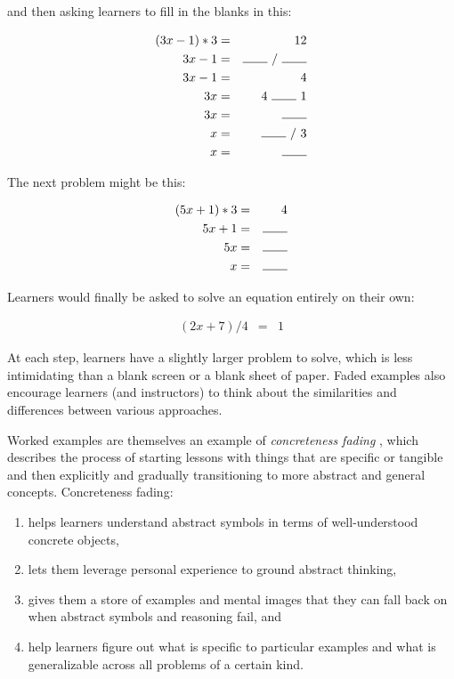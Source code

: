 \documentclass[10pt,letterpaper]{article}
\begin{document}
and then asking learners to fill in the blanks in this:

\begin{eqnarray*}
(3x - 1) * 3 & = & 12 \\
3x - 1 & = & \rule{2em}{0.15mm}~/~\rule{2em}{0.15mm} \\
3x - 1 & = & 4 \\
3x & = & 4~\rule{2em}{0.15mm}~1 \\
3x & = & \rule{2em}{0.15mm} \\
x & = & \rule{2em}{0.15mm}~/~3 \\
x & = & \rule{2em}{0.15mm} \\
\end{eqnarray*}

The next problem might be this:

\begin{eqnarray*}
(5x + 1) * 3 & = & 4 \\
5x + 1 & = & \rule{2em}{0.15mm} \\
5x & = & \rule{2em}{0.15mm} \\
x & = & \rule{2em}{0.15mm} \\
\end{eqnarray*}

Learners would finally be asked to solve an equation entirely on their own:

\begin{eqnarray*}
(2x + 7) / 4 & = & 1
\end{eqnarray*}

At each step, learners have a slightly larger problem to solve, which is less
intimidating than a blank screen or a blank sheet of paper.  Faded examples also
encourage learners (and instructors) to think about the similarities and
differences between various approaches.

Worked examples are themselves an example of \emph{concreteness fading}
\cite{Gold2005,Fyfe2014}, which describes the process of starting lessons with
things that are specific or tangible and then explicitly and gradually
transitioning to more abstract and general concepts.  Concreteness fading:

\begin{enumerate}

\item helps learners understand abstract symbols in terms of well-understood
  concrete objects,

\item lets them leverage personal experience to ground abstract thinking,

\item gives them a store of examples and mental images that they can fall back
  on when abstract symbols and reasoning fail, and

\item help learners figure out what is specific to particular examples and what
  is generalizable across all problems of a certain kind.

\end{enumerate}
\end{document}
